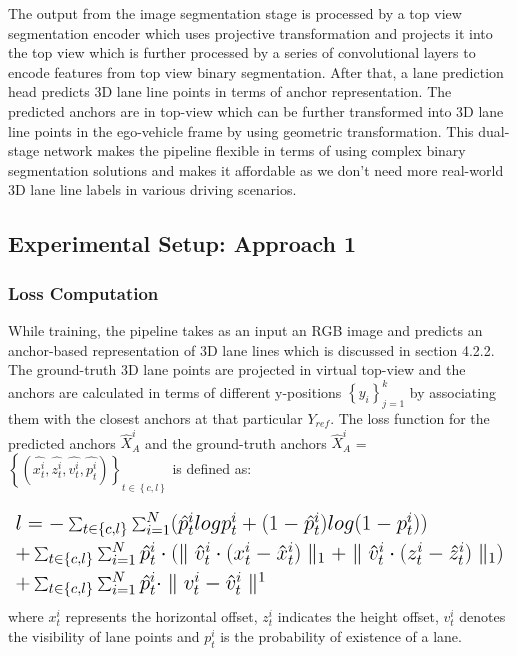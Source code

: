          The output from the image segmentation stage is processed by a top view segmentation encoder which uses projective transformation and projects it into the top view which is further processed by a series of convolutional layers to encode features from top view binary segmentation. After that, a lane prediction head predicts 3D lane line points in terms of anchor representation. The predicted anchors are in top-view which can be further transformed into 3D lane line points in the ego-vehicle frame by using geometric transformation. This dual-stage network makes the pipeline flexible in terms of using complex binary segmentation solutions and makes it affordable as we don't need more real-world 3D lane line labels in various driving scenarios.
        
        
        \subsection{Experimental Setup: Approach 1}
        
        
            \subsubsection{Loss Computation}
            While training, the pipeline takes as an input an RGB image and predicts an anchor-based representation of 3D lane lines which is discussed in section 4.2.2. The ground-truth 3D lane points are projected in virtual top-view and the anchors are calculated in terms of different y-positions $\left\{ y_{i} \right\}^{k}_{j=1}$ by associating them with the closest anchors at that particular $Y_{ref}$. The loss function for the predicted anchors $\hat{X}_{A}^{i}$ and the ground-truth anchors $\hat{X}_{A}^{i}$ =$ \left\{(\hat{x^{i}_{t}},\hat{z^{i}_{t}},\hat{v^{i}_{t}},\hat{p^{i}_{t}})\right\}_{t\in\left\{c,l\right\}}     $ is defined as: 
            
            \begin{equation}%
\mbox{\fontsize{15}{21.6}\selectfont\( %
 \begin{array}{l}
                l = - \sum_{t\in\left\{c,l\right\}} \sum ^{N}_{i=1}(\hat{p}^{i}_{t} logp^{i}_{t} + (1-\hat{p}^{i}_{t})log(1-p^{i}_{t}) )   \\ 
                +  \sum_{t\in\left\{c,l\right\}} \sum ^{N}_{i=1}\hat{p}^{i}_{t}\cdot(\parallel \hat{v}^{i}_{t} \cdot (x^{i}_{t} - \hat{x}^{i}_{t}) \parallel_{1} + \parallel \hat{v}^{i}_{t} \cdot (z^{i}_{t} - \hat{z}^{i}_{t}) \parallel_{1} ) \\ 
                + \sum_{t\in\left\{c,l\right\}} \sum ^{N}_{i=1} \hat{p}^{i}_{t} \cdot \parallel v^{i}_{t} - \hat{v}^{i}_{t} \parallel^{1}
            \end{array} %
\)} %
\end{equation}
            where $x^{i}_{t}$ represents the horizontal offset, $z^{i}_{t}$ indicates the height offset, $v^{i}_{t}$ denotes the visibility of lane points and $p^{i}_{t}$ is the probability of existence of a lane.  
        
